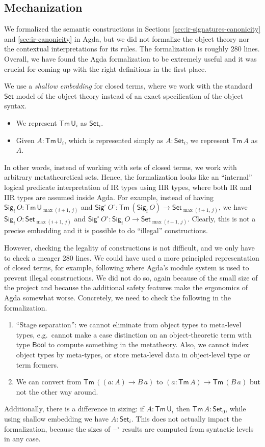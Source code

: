 \documentclass[acmsmall,screen,review]{acmart}
\newcommand{\msf}[1]{{\mathsf{#1}}}
\newcommand{\U}{\msf{U}}
\newcommand{\Set}{\msf{Set}}
\newcommand{\Sig}{\msf{Sig}}
\newcommand{\blank}{{\mathord{\hspace{1pt}\text{--}\hspace{1pt}}}}
\newcommand{\Bool}{\msf{Bool}}
\newcommand{\Tm}{\msf{Tm}}
\newcommand{\w}{\circ}
\begin{document}
\subsection{Mechanization}\label{sec:canonicity-mechanization}

We formalized the semantic constructions in Sections \ref{sec:ir-signatures-canonicity} and
\ref{sec:ir-canonicity} in Agda, but we did not formalize the object theory nor the contextual
interpretations for its rules. The formalization is roughly 280 lines. Overall, we have found the
Agda formalization to be extremely useful and it was crucial for coming up with the right
definitions in the first place.

We use a \emph{shallow embedding} for closed terms, where we work with the standard $\Set$ model of
the object theory instead of an exact specification of the object syntax.
\begin{itemize}
\item We represent $\Tm\,\U_i$ as $\Set_i$.
\item Given $A : \Tm\,\U_i$, which is represented simply as $A : \Set_i$, we represent $\Tm\,A$ as $A$.
\end{itemize}
In other words, instead of working with sets of closed terms, we work with arbitrary metatheoretical
sets. Hence, the formalization looks like an ``internal'' logical predicate interpretation of IR
types using IIR types, where both IR and IIR types are assumed inside Agda. For example, instead of
having $\Sig_i\,O : \Tm\,\U_{\max(i+1,\,j)}$ and $\Sig^\w\,O^\w : \Tm\,(\Sig_i\,O) \to
\Set_{\max(i+1,\,j)}$, we have $\Sig_i\,O : \Set_{\max(i+1,\,j)}$ and $\Sig^\w\,O^\w : \Sig_i\,O \to
\Set_{\max(i+1,\,j)}$. Clearly, this is not a precise embedding and it is possible to do ``illegal''
constructions.

However, checking the legality of constructions is not difficult, and we only have to check a meager
280 lines. We could have used a more principled representation of closed terms, for example,
following \citet{DBLP:conf/mpc/KaposiKK19} where Agda's module system is used to prevent illegal
constructions. We did not do so, again because of the small size of the project and because the
additional safety features make the ergonomics of Agda somewhat worse. Concretely, we need to check
the following in the formalization.
\begin{enumerate}
\item ``Stage separation'': we cannot eliminate from object types to meta-level types, e.g.\ cannot make a case distinction
      on an object-theoretic term with type $\Bool$ to compute something in the metatheory. Also, we cannot index
      object types by meta-types, or store meta-level data in object-level type or term formers.
\item We can convert from $\Tm\,((a : A) \to B\,a)$ to $(a : \Tm\,A) \to \Tm\,(B\,a)$ but not the other way around.
\end{enumerate}
Additionally, there is a difference in sizing: if $A : \Tm\,\U_i$ then $\Tm\,A : \Set_0$, while
using shallow embedding we have $A : \Set_i$. This does not actually impact the formalization,
because the sizes of $\blank^\w$ results are computed from syntactic levels in any case.
\end{document}
